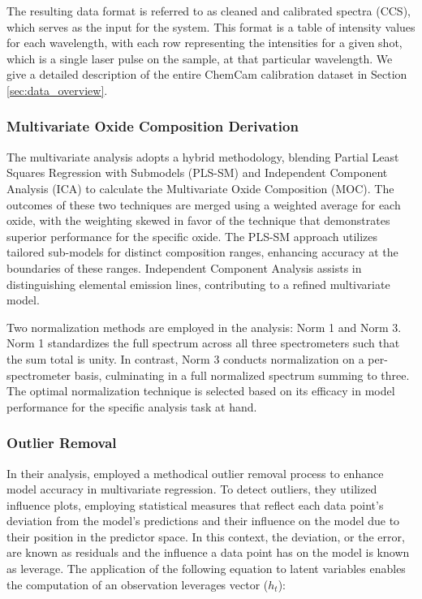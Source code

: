 The resulting data format is referred to as cleaned and calibrated spectra (CCS), which serves as the input for the system.
This format is a table of intensity values for each wavelength, with each row representing the intensities for a given shot, which is a single laser pulse on the sample, at that particular wavelength.
We give a detailed description of the entire ChemCam calibration dataset in Section \ref{sec:data_overview}.

\subsubsection{Multivariate Oxide Composition Derivation}\label{sec:moc_derivation}
The multivariate analysis adopts a hybrid methodology, blending Partial Least Squares Regression with Submodels (PLS-SM) and Independent Component Analysis (ICA) to calculate the Multivariate Oxide Composition (MOC).
The outcomes of these two techniques are merged using a weighted average for each oxide, with the weighting skewed in favor of the technique that demonstrates superior performance for the specific oxide.
The PLS-SM approach utilizes tailored sub-models for distinct composition ranges, enhancing accuracy at the boundaries of these ranges.
Independent Component Analysis assists in distinguishing elemental emission lines, contributing to a refined multivariate model.

Two normalization methods are employed in the analysis: Norm 1 and Norm 3.
Norm 1 standardizes the full spectrum across all three spectrometers such that the sum total is unity.
In contrast, Norm 3 conducts normalization on a per-spectrometer basis, culminating in a full normalized spectrum summing to three.
The optimal normalization technique is selected based on its efficacy in model performance for the specific analysis task at hand.

\subsubsection{Outlier Removal}\label{sec:outlier_removal}

In their analysis, \citet{andersonImprovedAccuracyQuantitative2017} employed a methodical outlier removal process to enhance model accuracy in multivariate regression. To detect outliers, they utilized influence plots, employing statistical measures that reflect each data point's deviation from the model's predictions and their influence on the model due to their position in the predictor space. 
In this context, the deviation, or the error, are known as residuals and the influence a data point has on the model is known as leverage.
The application of the following equation to latent variables enables the computation of an observation leverages vector (\(h_t\)):

